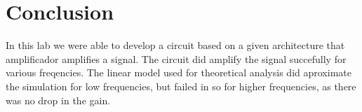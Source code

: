 \section{Conclusion}
\label{sec:conclusion} 

In this lab we were able to develop a circuit based on a given architecture that amplificador amplifies a signal. The circuit did amplify the signal succefully for various freqencies. The linear model used for theoretical analysis did aproximate the simulation for low frequencies, but failed in so for higher frequencies, as there was no drop in the gain. 
